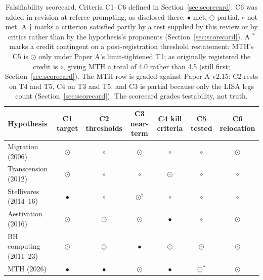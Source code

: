 \documentclass[11pt]{article}
\newcommand{\sfull}{\ensuremath{\bullet}}   %
\newcommand{\shalf}{\ensuremath{\odot}} %
\newcommand{\snone}{\ensuremath{\circ}}     %
\begin{document}
\begin{table}[tbp]
\centering
\caption{Falsifiability scorecard. Criteria C1--C6 defined in Section~\ref{sec:scorecard}; C6 was added in revision at referee prompting, as disclosed there. \sfull{} met, \shalf{} partial, \snone{} not met. A $\dagger$ marks a criterion satisfied partly by a test supplied by this review or by critics rather than by the hypothesis's proponents (Section~\ref{sec:scorecard}). A $^{*}$ marks a credit contingent on a post-registration threshold restatement: MTH's C5 is \shalf{} only under Paper A's limit-tightened T1; as originally registered the credit is \snone{}, giving MTH a total of 4.0 rather than 4.5 (still first; Section~\ref{sec:scorecard}). The MTH row is graded against Paper A v2.15: C2 rests on T4 and T5, C4 on T3 and T5, and C3 is partial because only the LISA legs count (Section~\ref{sec:scorecard}). The scorecard grades testability, not truth.}
\label{tab:scorecard}
\footnotesize
\begin{tabular}{lcccccc}
\toprule
Hypothesis & C1 target & C2 thresholds & C3 near-term & C4 kill criteria & C5 tested & C6 relocation \\
\midrule
Migration (2006) & \shalf & \snone & \shalf & \snone & \snone & \shalf \\
Transcension (2012) & \shalf & \snone & \snone & \shalf & \snone & \snone \\
Stellivores (2014--16) & \sfull & \snone & \shalf$^\dagger$ & \snone & \snone & \snone \\
Aestivation (2016) & \shalf & \shalf & \shalf & \sfull & \snone & \shalf \\
BH computing (2011--23) & \shalf & \shalf & \sfull & \shalf & \shalf & \shalf \\
MTH (2026) & \sfull & \sfull & \shalf & \sfull & \shalf$^{*}$ & \shalf \\
\bottomrule
\end{tabular}
\end{table}
\end{document}
